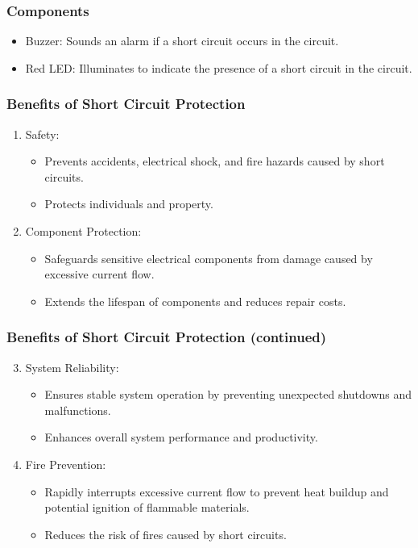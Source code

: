 \documentclass{beamer}
\begin{document}
\begin{frame}
\frametitle{Components}
\begin{itemize}
\item Buzzer: Sounds an alarm if a short circuit occurs in the circuit.
\item Red LED: Illuminates to indicate the presence of a short circuit in the circuit.
\end{itemize}
\end{frame}

\begin{frame}
\frametitle{Benefits of Short Circuit Protection}
\begin{enumerate}
\item Safety:
\begin{itemize}
\item Prevents accidents, electrical shock, and fire hazards caused by short circuits.
\item Protects individuals and property.
\end{itemize}
\item Component Protection:
\begin{itemize}
\item Safeguards sensitive electrical components from damage caused by excessive current flow.
\item Extends the lifespan of components and reduces repair costs.
\end{itemize}
\end{enumerate}
\end{frame}

\begin{frame}
\frametitle{Benefits of Short Circuit Protection (continued)}
\begin{enumerate}
\setcounter{enumi}{2}
\item System Reliability:
\begin{itemize}
\item Ensures stable system operation by preventing unexpected shutdowns and malfunctions.
\item Enhances overall system performance and productivity.
\end{itemize}
\item Fire Prevention:
\begin{itemize}
\item Rapidly interrupts excessive current flow to prevent heat buildup and potential ignition of flammable materials.
\item Reduces the risk of fires caused by short circuits.
\end{itemize}
\end{enumerate}
\end{frame}
\end{document}
